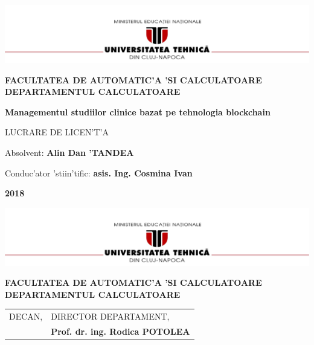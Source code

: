 \documentclass[12pt,a4paper,twoside]{report}
\renewcommand{\thesisauthor}{Alin Dan 'TANDEA}    %
\renewcommand{\thesisyear}{2018}      %
\renewcommand{\thesistitle}{Managementul studiilor clinice bazat pe
tehnologia blockchain} %
\renewcommand{\thesissupervisor}{asis. Ing. Cosmina Ivan}
\newcommand{\department}{FACULTATEA DE AUTOMATIC'A 'SI CALCULATOARE\\
DEPARTAMENTUL CALCULATOARE}
\newcommand{\thesis}{LUCRARE DE LICEN'T'A}
\newcommand{\utcnlogo}{\includegraphics[width=15cm]{img/utcn.jpg}}
\begin{document}

\newenvironment{definition}[1][Defini'tie.]{\begin{trivlist}
\item[\hskip \labelsep {\bfseries #1}]}{\end{trivlist}}






\setcounter{page}{4}



\begin{center}
\utcnlogo

{\bf \department}

\vspace{4cm}

{\bf \thesistitle} %

\vspace{1.5cm}

\thesis

\vspace{6cm}

Absolvent: {\bf \thesisauthor} 

Conduc'ator 'stiin'tific: {\bf \thesissupervisor}

\vspace{3cm}
{\bf \thesisyear}
\end{center}

\thispagestyle{empty}
\newpage

\begin{center}
\utcnlogo

{\bf \department}
\end{center}
\vspace{0.5cm}

\begin{tabular}{p{7cm}p{8cm}}
 \hspace{-1cm}DECAN, & DIRECTOR DEPARTAMENT,\\
\hspace{-1cm}{\bf Prof. dr. ing. Liviu MICLEA} & {\bf Prof. dr. ing. Rodica POTOLEA}\\  
\end{tabular}
 
\end{document}
